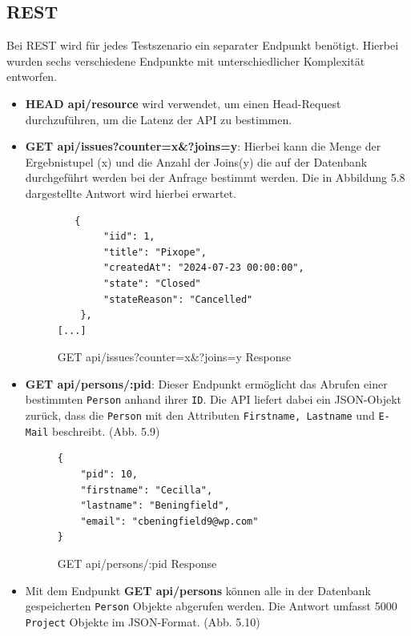 \subsection{REST}
\label{sec:rest}
Bei REST wird für jedes Testszenario ein separater Endpunkt benötigt. Hierbei wurden sechs verschiedene Endpunkte mit unterschiedlicher Komplexität entworfen.

\begin{itemize}
\item \colorbox{gray!20}{\textbf{HEAD api/resource}} wird verwendet, um einen Head-Request durchzuführen, um die Latenz der API zu bestimmen.
\item \colorbox{gray!20}{\textbf{GET api/issues?counter=x\&?joins=y}}: Hierbei kann die Menge der Ergebnistupel (x) und die Anzahl der Joins(y) die auf der Datenbank durchgeführt werden bei der Anfrage bestimmt werden. Die in Abbildung 5.8 dargestellte Antwort wird hierbei erwartet.
\begin{figure}[H]
\begin{center}
\begin{BVerbatim}
   {
        "iid": 1,
        "title": "Pixope",
        "createdAt": "2024-07-23 00:00:00",
        "state": "Closed"
        "stateReason": "Cancelled"
    },
[...]
\end{BVerbatim}
\end{center}
\caption{GET api/issues?counter=x\&?joins=y Response}
\end{figure}


\item \colorbox{gray!20}{\textbf{GET api/persons/:pid}}: Dieser Endpunkt ermöglicht das Abrufen einer bestimmten \texttt{Person} anhand ihrer \texttt{ID}. Die API liefert dabei ein JSON-Objekt zurück, dass die \texttt{Person} mit den Attributen \texttt{Firstname, Lastname} und \texttt{E-Mail} beschreibt. (Abb. 5.9)
\begin{figure}[H]
\begin{center}
\begin{BVerbatim}
{
    "pid": 10,
    "firstname": "Cecilla",
    "lastname": "Beningfield",
    "email": "cbeningfield9@wp.com"
}
\end{BVerbatim}
\end{center}
\caption{GET api/persons/:pid Response}
\end{figure}

\item Mit dem Endpunkt  \colorbox{gray!20}{\textbf{GET api/persons}} können alle in der Datenbank gespeicherten \texttt{Person} Objekte abgerufen werden. Die Antwort umfasst 5000 \texttt{Project} Objekte im JSON-Format. (Abb. 5.10)


\end{itemize}
